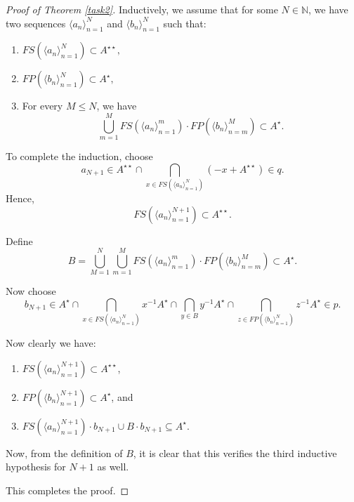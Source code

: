 \documentclass{article}
\theoremstyle{Theorem}
\theoremstyle{definition}
\begin{document}
\begin{proof}[Proof of Theorem \ref{task2}]
Inductively, we assume that for some \( N \in \mathbb{N} \), we have two sequences \( \langle a_n \rangle_{n=1}^N \) and \( \langle b_n \rangle_{n=1}^N \) such that:
\begin{enumerate}
    \item \( FS\left(\langle a_n \rangle_{n=1}^N\right) \subset A^{\star\star}, \)
    \item \( FP\left(\langle b_n \rangle_{n=1}^N\right) \subset A^\star, \)
    \item For every \( M \leq N \), we have
    \[
    \bigcup_{m=1}^M FS\left(\langle a_n \rangle_{n=1}^m\right) \cdot FP\left(\langle b_n \rangle_{n=m}^M\right) \subset A^\star.
    \]
\end{enumerate}

To complete the induction, choose
\[
a_{N+1} \in A^{\star\star} \cap \bigcap_{x \in FS\left(\langle a_n \rangle_{n=1}^N\right)} (-x + A^{\star\star}) \in q.
\]
Hence,
\[
FS\left(\langle a_n \rangle_{n=1}^{N+1}\right) \subset A^{\star\star}.
\]

Define
\[
B = \bigcup_{M=1}^N \bigcup_{m=1}^M FS\left(\langle a_n \rangle_{n=1}^m\right) \cdot FP\left(\langle b_n \rangle_{n=m}^M\right) \subset A^\star.
\]

Now choose
\[
b_{N+1} \in A^\star \cap \bigcap_{x \in FS\left(\langle a_n \rangle_{n=1}^N\right)} x^{-1}A^\star \cap \bigcap_{y \in B} y^{-1}A^\star \cap \bigcap_{z \in FP\left(\langle b_n \rangle_{n=1}^N\right)} z^{-1}A^\star \in p.
\]


Now clearly we have:
\begin{enumerate}
    \item \( FS\left(\langle a_n \rangle_{n=1}^{N+1} \right) \subset A^{\star\star} \),
    \item \( FP\left(\langle b_n \rangle_{n=1}^{N+1} \right) \subset A^\star \), and
    \item \( FS\left(\langle a_n \rangle_{n=1}^{N+1} \right) \cdot b_{N+1} \cup B \cdot b_{N+1} \subseteq A^\star \).
\end{enumerate}

Now, from the definition of \( B \), it is clear that this verifies the third inductive hypothesis for \( N+1 \) as well.

This completes the proof.
\end{proof}
\end{document}
